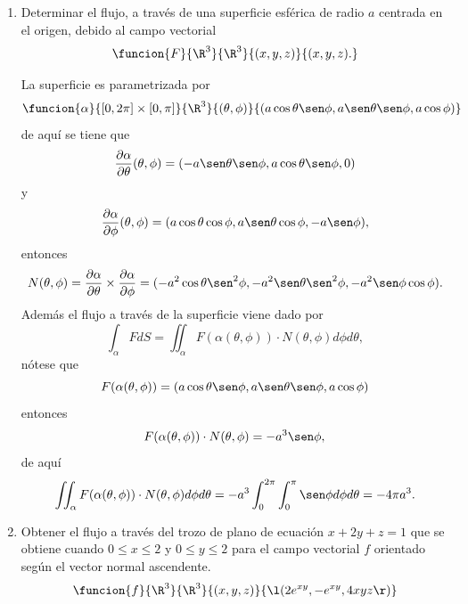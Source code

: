 \documentclass[a4,11pt]{aleph-examen}
\begin{document}
\begin{preguntas}
\begin{respuesta}
\begin{respuesta}
\begin{respuesta}
\begin{enumerate}
\item
    Determinar el flujo, a través de una superficie esférica de radio $a$ centrada en el origen, debido al campo vectorial
    \[
        \funcion{F}{\R^3}{\R^3}{(x,y,z)}{(x,y,z).}
    \]
\begin{respuesta}
    La superficie es parametrizada por
    \[
        \funcion{\alpha}{[0,2\pi]\times [0,\pi]}{\R^3}{(\theta,\phi)}{(a\cos \theta \sen \phi,a\sen \theta \sen \phi,a \cos \phi)}
    \]
    de aquí se tiene que
    \[
        \frac{\partial \alpha}{\partial \theta}(\theta,\phi)=(-a\sen \theta \sen \phi,a\cos \theta \sen \phi,0)
    \]
    y
    \[
        \frac{\partial \alpha}{\partial \phi}(\theta,\phi)=(a\cos \theta \cos \phi,a\sen \theta \cos \phi,-a \sen \phi),
    \]
    entonces
    \[
        N(\theta,\phi)=\frac{\partial \alpha}{\partial \theta} \times \frac{\partial \alpha}{\partial \phi}=(-a^2\cos\theta\sen^2\phi,-a^2\sen\theta\sen^2\phi,-a^2\sen\phi\cos\phi).
    \]
    Además el flujo a través de la superficie viene dado por
    \[
        \int_\alpha FdS=\iint_\alpha F(\alpha(\theta,\phi))\cdot N(\theta,\phi)d\phi d\theta,
    \]
    nótese que 
    \[
        F(\alpha(\theta,\phi))=(a\cos \theta \sen \phi,a\sen \theta \sen \phi,a \cos \phi)
    \]
    entonces
    \[
        F(\alpha(\theta,\phi))\cdot N(\theta,\phi)=-a^3\sen\phi,
    \]
    de aquí
    \[
        \iint_\alpha F(\alpha(\theta,\phi))\cdot N(\theta,\phi)d\phi d\theta=-a^3\int_0^{2\pi}\int_0^{\pi}\sen\phi d\phi d\theta=-4\pi a^3.
    \]
\end{respuesta}

\item 
    Obtener el flujo a través del trozo de plano de ecuación $x+2y+z=1$ que se obtiene cuando $0 \leq x \leq 2$ y $0 \leq y \leq 2$ para el campo vectorial $f$ orientado según el vector normal ascendente. 
	\[
    	\funcion{f}{\R^3}{\R^3}{(x,y,z)}{\l(2e^{xy},-e^{xy},4xyz\r)}
    \]


\end{enumerate}
\end{respuesta}
\end{respuesta}
\end{respuesta}
\end{preguntas}
\end{document}
